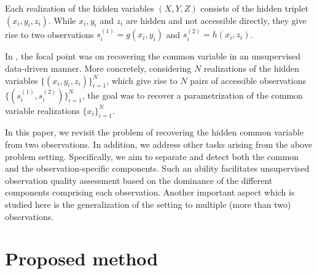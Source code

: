 \documentclass[]{article}
\theoremstyle{definition}
\begin{document}
Each realization of the hidden variables $(X,Y,Z)$ consists of the hidden triplet $(x_i,y_i,z_i)$.
While $x_i,y_i$ and $z_i$ are hidden and not accessible directly, they give rise to two observations $s^{(1)}_i = g(x_i,y_i)$ and $s^{(2)}_i = h(x_i,z_i)$.
	
In \cite{lederman2018learning}, the focal point was on recovering the common variable in an unsupervised data-driven manner. More concretely, considering $N$ realizations of the hidden variables $\{(x_i,y_i,z_i)\}_{i=1}^N$, which give rise to $N$ pairs of accessible observations $\{(s^{(1)}_i,s^{(2)}_i)\}_{i=1}^N$, the goal was to recover a parametrization of the common variable realizations $\{x_i\}_{i=1}^N$. 
	
In this paper, we revisit the problem of recovering the hidden common variable from two observations. In addition, we address other tasks arising from the above problem setting. Specifically, we aim to separate and detect both the common and the observation-specific components. Such an ability facilitates unsupervised observation quality assessment based on the dominance of the different components comprising each observation. Another important aspect which is studied here is the generalization of the setting to multiple (more than two) observations.
	
\section{Proposed method}
\end{document}
